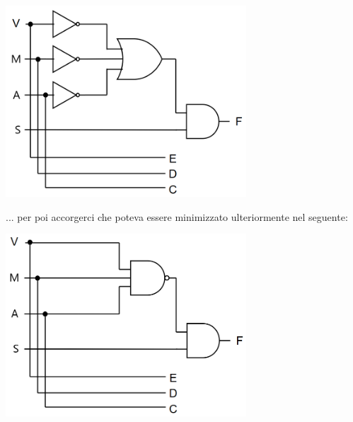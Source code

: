 \begin{questions}
\begin{solution}
            \begin{center}
				\includegraphics[width=9cm, keepaspectratio]{img/circuito_minimizzato_1.png}
            \end{center}
            
            ... per poi accorgerci che poteva essere minimizzato ulteriormente nel seguente:
            
            \begin{center}
            	\includegraphics[width=9cm, keepaspectratio]{img/circuito_minimizzato_2.png}
            \end{center}
                 

    \end{solution}
\end{questions}